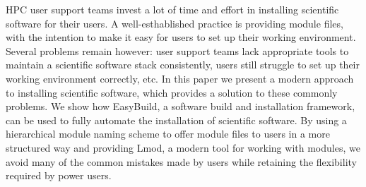 
HPC user support teams invest a lot of time and effort in installing scientific
software for their users. A well-esthablished practice is providing module files,
with the intention to make it easy for users to set up their working environment.
Several problems remain however: user support teams lack appropriate tools to maintain a
scientific software stack consistently, users still struggle to set up their working
environment correctly, etc.
In this paper we present a modern approach to installing scientific software, which provides
a solution to these commonly problems. We show how EasyBuild, a software build and
installation framework, can be used to fully automate the installation of scientific software.
By using a hierarchical module naming scheme to offer module files to users in a more structured
way and providing Lmod, a modern tool for working with modules, we avoid many of the common
mistakes made by users while retaining the flexibility required by power users. 
